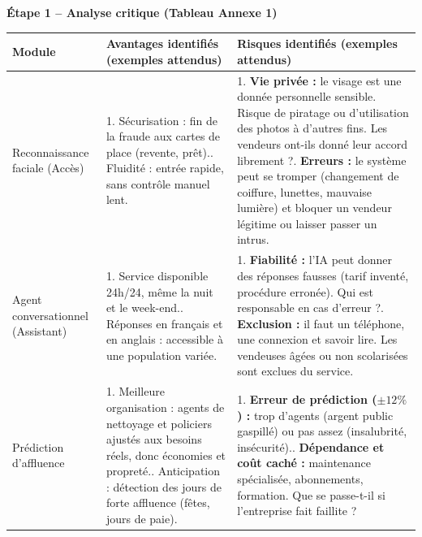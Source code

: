 \documentclass[11pt]{article}
\newcounter{popsec}
\newcounter{popsub}
\newcommand{\courssub}[1]{%
  \stepcounter{popsub}%
  \par\vspace{9pt}\noindent{\popxbold\fontsize{11.5}{13}\selectfont\color{popink}{\color{poporange}\thepopsec.\thepopsub}\hspace{6pt}#1}\par\nopagebreak\vspace{4pt}
}
\begin{document}
\courssub{Démarche et corrigé commenté}
\begin{exoresolu}
\textbf{Étape 1 -- Analyse critique (Tableau Annexe 1)}

\begin{center}
\begin{tabularx}{\linewidth}{|l|X|X|}
\hline
\rowcolor{popblueL}
\textbf{Module} & \textbf{Avantages identifiés (exemples attendus)} & \textbf{Risques identifiés (exemples attendus)} \\
\hline
Reconnaissance faciale (Accès) & 1. Sécurisation : fin de la fraude aux cartes de place (revente, prêt).\newline 2. Fluidité : entrée rapide, sans contrôle manuel lent. & 1. \textbf{Vie privée :} le visage est une donnée personnelle sensible. Risque de piratage ou d'utilisation des photos à d'autres fins. Les vendeurs ont-ils donné leur accord librement ?\newline 2. \textbf{Erreurs :} le système peut se tromper (changement de coiffure, lunettes, mauvaise lumière) et bloquer un vendeur légitime ou laisser passer un intrus. \\
\hline
Agent conversationnel (Assistant) & 1. Service disponible 24h/24, même la nuit et le week-end.\newline 2. Réponses en français et en anglais : accessible à une population variée. & 1. \textbf{Fiabilité :} l'IA peut donner des réponses fausses (tarif inventé, procédure erronée). Qui est responsable en cas d'erreur ?\newline 2. \textbf{Exclusion :} il faut un téléphone, une connexion et savoir lire. Les vendeuses âgées ou non scolarisées sont exclues du service. \\
\hline
Prédiction d'affluence & 1. Meilleure organisation : agents de nettoyage et policiers ajustés aux besoins réels, donc économies et propreté.\newline 2. Anticipation : détection des jours de forte affluence (fêtes, jours de paie). & 1. \textbf{Erreur de prédiction ($\pm 12\%$) :} trop d'agents (argent public gaspillé) ou pas assez (insalubrité, insécurité).\newline 2. \textbf{Dépendance et coût caché :} maintenance spécialisée, abonnements, formation. Que se passe-t-il si l'entreprise fait faillite ? \\
\hline
\end{tabularx}
\end{center}


\end{exoresolu}
\end{document}
